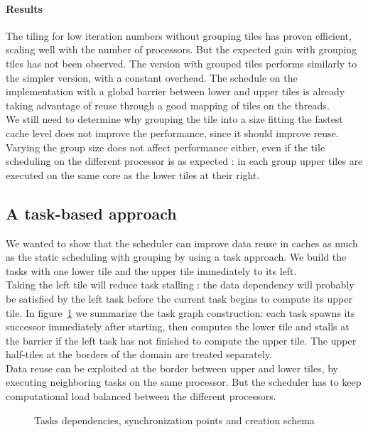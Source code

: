 \documentclass[a4paper,11pt]{article}
\begin{document}
\paragraph{Results} The tiling for low iteration numbers without grouping tiles has proven efficient,
scaling well with the number of processors. But the expected gain with grouping tiles
has not been observed. The version with grouped tiles performs similarly to the simpler
version, with a constant overhead. The schedule on the implementation
with a global barrier between lower and upper tiles is already taking advantage of reuse
through a good mapping of tiles on the threads. \\
We still need to determine why grouping the tile into a size fitting the fastest cache
level does not improve the performance, since it should improve reuse. Varying the group
size does not affect performance either, even if the tile scheduling on the different processor
is as expected : in each group upper tiles are executed on the same core as the lower tiles
at their right.

\subsection{A task-based approach}
We wanted to show that the scheduler can improve data reuse in caches as much as the static 
scheduling with grouping by using a task approach. We build the tasks with
one lower tile and the upper tile immediately to its left. \\
Taking the left tile will reduce task stalling : the data dependency will probably be satisfied 
by the left task before the current task  begins to compute its upper tile. In 
figure~\ref{hdiam_tasking} we summarize the task graph construction: each task 
spawns its successor immediately after starting, then computes the lower tile and 
stalls at the barrier if the left task has not finished to compute the upper
tile. The upper half-tiles at the borders of the domain are treated separately.\\
Data reuse can be exploited at the border between upper and lower tiles, by executing
neighboring tasks on the same processor. But the scheduler has to keep computational
load balanced between the different processors.

\begin{figure}[h]
 
 \caption{Tasks dependencies, synchronization points and creation schema}
 \label{hdiam_tasking}
\end{figure}
\end{document}
